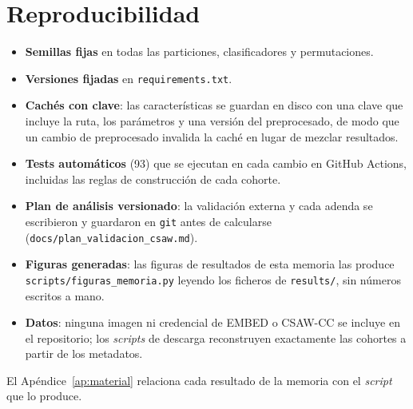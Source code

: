 \section{Reproducibilidad}
\begin{itemize}
  \item \textbf{Semillas fijas} en todas las particiones, clasificadores y
        permutaciones.
  \item \textbf{Versiones fijadas} en \texttt{requirements.txt}.
  \item \textbf{Cachés con clave}: las características se guardan en disco con
        una clave que incluye la ruta, los parámetros y una versión del
        preprocesado, de modo que un cambio de preprocesado invalida la caché
        en lugar de mezclar resultados.
  \item \textbf{Tests automáticos} (93) que se ejecutan en cada cambio en
        GitHub Actions, incluidas las reglas de construcción de cada cohorte.
  \item \textbf{Plan de análisis versionado}: la validación externa y cada
        adenda se escribieron y guardaron en \texttt{git} antes de calcularse
        (\texttt{docs/plan\_validacion\_csaw.md}).
  \item \textbf{Figuras generadas}: las figuras de resultados de esta memoria
        las produce \texttt{scripts/figuras\_memoria.py} leyendo los ficheros
        de \texttt{results/}, sin números escritos a mano.
  \item \textbf{Datos}: ninguna imagen ni credencial de EMBED o CSAW-CC se
        incluye en el repositorio; los \textit{scripts} de descarga
        reconstruyen exactamente las cohortes a partir de los metadatos.
\end{itemize}
El Apéndice~\ref{ap:material} relaciona cada resultado de la memoria con el
\textit{script} que lo produce.
